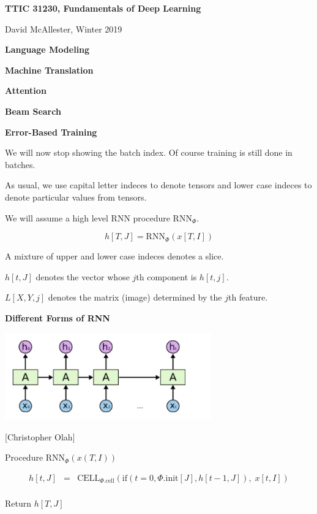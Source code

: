 




{\Huge

  \centerline{\bf TTIC 31230, Fundamentals of Deep Learning}
  \bigskip
  \centerline{David McAllester, Winter 2019}
  \vfill
  \centerline{\bf Language Modeling}
  \vfill
  \centerline{\bf Machine Translation}
  \vfill
  \centerline{\bf Attention}
  \vfill
  \centerline{\bf Beam Search}
  \vfill
  \centerline{\bf Error-Based Training}

We will now stop showing the batch index.  Of course training is still done in batches.


\vfill
As usual, we use capital letter indeces to denote tensors and lower case indeces to denote particular values from tensors.

\vfill
We will assume a high level RNN procedure $\mathrm{RNN}_\Phi$.

\vfill
$$h[T,J] = \mathrm{RNN}_\Phi(x[T,I])$$


A mixture of upper and lower case indeces denotes a slice.

\vfill
$h[t,J]$ denotes the vector whose $j$th component is $h[t,j]$.

\vfill
$L[X,Y,j]$ denotes the matrix (image) determined by the $j$th feature.

\slide{}


\centerline{\bf Different Forms of RNN}
\vfill
\vfill



\centerline{\includegraphics[width=3.5in]{../images/RNN}}
\centerline{{\large [Christopher Olah]}}
\vfill
Procedure $\mathrm{RNN}_\Phi(x(T,I))$

\vfill
\begin{eqnarray*}
h[t,J] & = & \mathrm{CELL}_{\Phi.\mathrm{cell}}(\mathrm{if}(t=0,\Phi.\mathrm{init}[J],h[t-1,J]),\;x[t,I]) \\
\end{eqnarray*}

\vfill
Return $h[T,J]$



}
